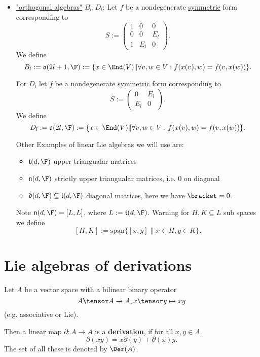 \begin{example}
\begin{itemize}[label=]
        \item \underline{"orthogonal algebras"} $B_l,D_l$:
        \renewcommand{\o}{\mathfrak{o}}
        Let $f$ be a nondegenerate \underline{symmetric} form corresponding to
        $$ S := \begin{pmatrix}
            1 & 0 & 0 \\
            0 & 0 & E_l \\
            1 & E_l & 0
        \end{pmatrix}.$$
        We define
        $$B_l := \o(2l+1, \F) := \{x \in \End(V) \| \forall v,w \in V: f(x(v),w) = f(v, x(w))\}.$$
        
        For $D_l$ let $f$ be a nondegenerate \underline{symmetric} form corresponding to
        $$ S := \begin{pmatrix}
            0 & E_l \\
            E_l & 0
        \end{pmatrix}.$$
        We define
        $$D_l := \o(2l, \F) := \{x \in \End(V) \| \forall v,w \in V: f(x(v),w) = f(v, x(w))\}.$$
        
        Other Examples of linear Lie algebras we will use are:
        \begin{itemize}
            \item $\mathfrak{t}(d,\F)$ upper triangualar matrices
            \item $\mathfrak{n}(d,\F)$ strictly upper triangualar matrices, i.e. 0 on diagonal
            \item $\mathfrak{d}(d,\F) \subseteq \mathfrak{t}(d,\F)$ diagonal matrices, here we have $\bracket = 0$.
        \end{itemize}
        Note $ \mathfrak{n}(d, \F) = [L,L]$, where $L:= \mathfrak{t}(d,\F)$.
        Warning for $H,K \subseteq L$ sub spaces we define
        $$ [H,K] := \text{span} \{[x,y] \| x\in H,y \in K\}. $$
    \end{itemize}
\end{example}

\section{Lie algebras of derivations}

\begin{definition}
    Let $A$ be a vector space with a bilinear binary operator
    $$ A \tensor A \to A, x\tensor y \mapsto xy$$
    (e.g. associative or Lie).

    Then a linear map $ \partial: A \to A $ is a \textbf{derivation}, if for all $x,y \in A$ 
    $$ \partial(xy) = x\partial(y) + \partial(x)y. $$
    The set of all these is denoted by $\Der(A)$.
\end{definition}

